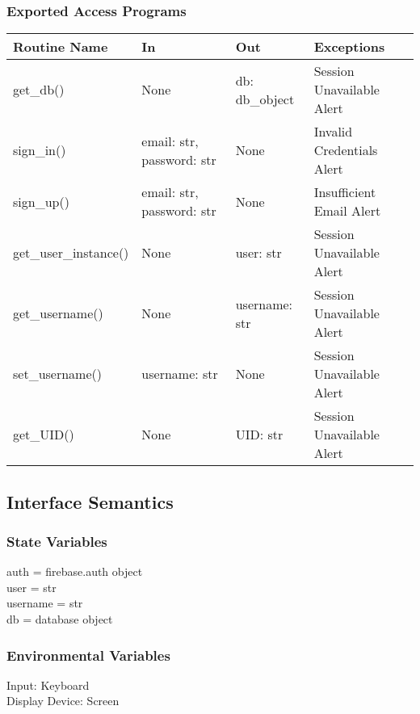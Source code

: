 \documentclass[12pt, titlepage]{article}
\begin{document}
\subsubsection* {Exported Access Programs}
\begin{table}[!htb]
    \centering
    \begin{tabular}{|p{3.5cm}|p{3cm}|p{3.5cm}|p{3cm}|}
        \hline
        \textbf{Routine Name} & \textbf{In} & \textbf{Out} & \textbf{Exceptions} \\
        \hline
         get\_db() & None & db: db\_object & Session Unavailable Alert\\
        \hline
         sign\_in() & email: str, password: str  & None & Invalid Credentials Alert\\
        \hline
         sign\_up() & email: str, password: str  & None & Insufficient Email Alert\\
        \hline
         get\_user\_instance() & None  & user: str & Session Unavailable Alert\\
        \hline
         get\_username() & None  & username: str & Session Unavailable Alert\\
        \hline
         set\_username() & username: str  & None & Session Unavailable Alert\\
        \hline
         get\_UID() & None & UID: str & Session Unavailable Alert\\
        \hline
    \end{tabular}
\end{table}

\subsection{Interface Semantics}
\subsubsection{State Variables}
        auth = firebase.auth object\\
        user = str\\
        username = str\\
        db = database object\\
\subsubsection{Environmental Variables}
Input: Keyboard\\
Display Device: Screen
\end{document}
